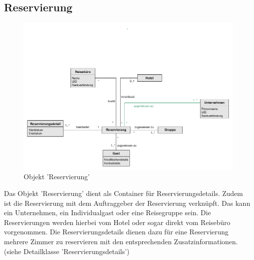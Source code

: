 \documentclass[../../Pflichtenheft.tex]{subfiles}
\begin{document}
    \subsection{Reservierung}
        \begin{figure}[ht!]
            \begin{center}
                \includegraphics[width=0.7\linewidth]{assets/reservierung.png}
                \caption{Objekt 'Reservierung'} \label{reservierung_model}
            \end{center}
        \end{figure}
    Das Objekt 'Reservierung' dient als Container für Reservierungsdetails. Zudem
    ist die Reservierung mit dem Auftraggeber der Reservierung verknüpft. Das kann
    ein Unternehmen, ein Individualgast oder eine Reisegruppe sein. Die Reservierungen
    werden hierbei vom Hotel oder sogar direkt vom Reisebüro vorgenommen. Die Reservierungsdetails
    dienen dazu für eine Reservierung mehrere Zimmer zu reservieren mit den entsprechenden Zusatzinformationen.
    (siehe Detailklasse 'Reservierungsdetails')
\end{document}
